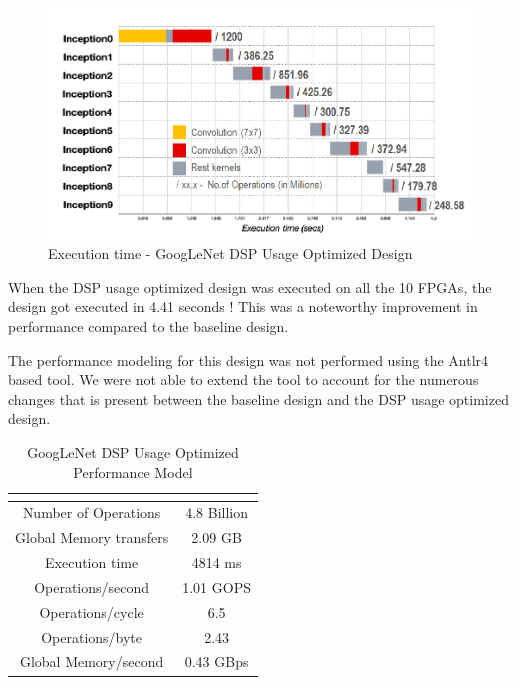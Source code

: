 \begin{figure}[!htb]
  \includegraphics[width=\textwidth,height=\textheight,keepaspectratio]{img/GoogLeNetDSPOpt_Runtime_Graph.png}
  \caption{Execution time - GoogLeNet DSP Usage Optimized Design}
  \label{fig:GoogLeNetDSPOpt_Runtime_Graph}
\end{figure}


When the DSP usage optimized design was executed on all the 10 FPGAs, the design got executed in 4.41 seconds ! This was a noteworthy improvement in performance compared to the baseline design. 

The performance modeling for this design was not performed using the Antlr4 based tool. We were not able to extend the tool to account for the numerous changes that is present between the baseline design and the DSP usage optimized design.


\begin{table}[!htb]                          
 \centering
 \captionsetup{
 justification = centering
}
 \caption{GoogLeNet DSP Usage Optimized Performance Model}
    \begin{tabular}{|c|c|}
    \multicolumn{2}{c}{\textbf{}} \\ \hline

     Number of Operations    &   4.8 Billion \\ \hline
      Global Memory transfers &   2.09 GB            \\ \hline          
      Execution time    &  4814 ms    \\ \hline
      Operations/second   &   1.01 GOPS \\ \hline
      Operations/cycle &   6.5             \\ \hline
      Operations/byte       &   2.43 \\ \hline
      Global Memory/second & 0.43 GBps  \\ \hline

    \end{tabular}
    
    \label{tab:GoogLeNetDSPPerfModel}                            

\end{table} 

